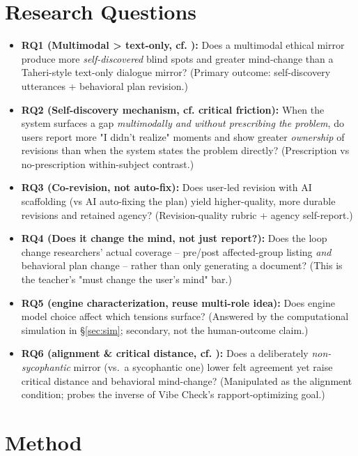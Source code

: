 \documentclass[manuscript,screen]{acmart}
\begin{document}
\section{Research Questions}
\begin{itemize}
  \item \textbf{RQ1 (Multimodal > text-only, cf. \citep{taheri26}):} Does a multimodal
    ethical mirror produce more \emph{self-discovered} blind spots and greater
    mind-change than a Taheri-style text-only dialogue mirror? (Primary outcome:
    self-discovery utterances + behavioral plan revision.)
  \item \textbf{RQ2 (Self-discovery mechanism, cf. \citep{taheri26} critical friction):}
    When the system surfaces a gap \emph{multimodally and without prescribing the
    problem}, do users report more "I didn't realize" moments and show greater
    \emph{ownership} of revisions than when the system states the problem directly?
    (Prescription vs no-prescription within-subject contrast.)
  \item \textbf{RQ3 (Co-revision, not auto-fix):} Does user-led revision with AI
    scaffolding (vs AI auto-fixing the plan) yield higher-quality, more durable
    revisions and retained agency? (Revision-quality rubric + agency self-report.)
  \item \textbf{RQ4 (Does it change the mind, not just report?):} Does the loop change
    researchers' actual coverage -- pre/post affected-group listing \emph{and}
    behavioral plan change -- rather than only generating a document? (This is the
    teacher's "must change the user's mind" bar.)
  \item \textbf{RQ5 (engine characterization, reuse \citep{perspectra26} multi-role idea):}
    Does engine model choice affect which tensions surface? (Answered by the
    computational simulation in \S\ref{sec:sim}; secondary, not the human-outcome claim.)
  \item \textbf{RQ6 (alignment \& critical distance, cf. \citep{vibecheck26}):} Does a
    deliberately \emph{non-sycophantic} mirror (vs.\ a sycophantic one) lower felt
    agreement yet raise critical distance and behavioral mind-change? (Manipulated as
    the alignment condition; probes the inverse of Vibe Check's rapport-optimizing goal.)
\end{itemize}

\section{Method}
\end{document}

